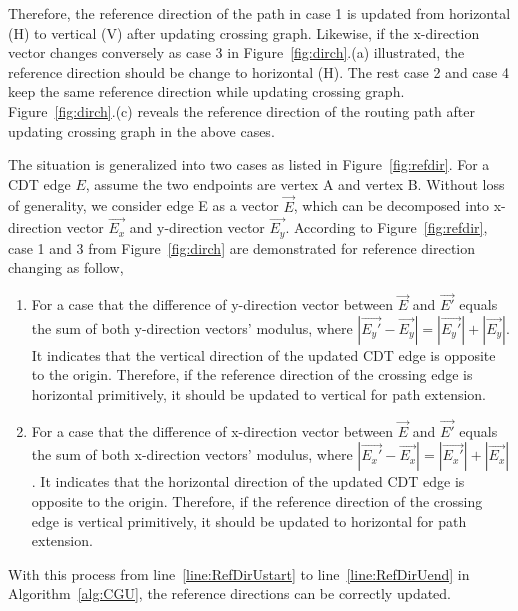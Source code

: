     Therefore, the reference direction of the path in case 1 is updated from horizontal (H) to vertical (V) after updating crossing graph. Likewise, if the x-direction vector changes conversely as case 3 in Figure~\ref{fig:dirch}.(a) illustrated, the reference direction should be change to horizontal (H). The rest case 2 and case 4 keep the same reference direction while updating crossing graph. Figure~\ref{fig:dirch}.(c) reveals the reference direction of the routing path after updating crossing graph in the above cases.

    The situation is generalized into two cases as listed in Figure~\ref{fig:refdir}.
    For a CDT edge $E$, assume the two endpoints are vertex A and vertex B. Without loss of generality, we consider edge E as a vector $\overrightarrow{E}$, which can be decomposed into x-direction vector $\overrightarrow{E_x}$ and y-direction vector $\overrightarrow{E_y}$. According to Figure~\ref{fig:refdir}, case 1 and 3 from Figure~\ref{fig:dirch} are demonstrated for reference direction changing as follow, 

    


    \begin{enumerate}
      \item For a case that the difference of y-direction vector between $\overrightarrow{E}$ and $\overrightarrow{E'}$ equals the sum of both y-direction vectors' modulus, where $|\overrightarrow{E_y'} - \overrightarrow{E_y}|=|\overrightarrow{E_y'}|+|\overrightarrow{E_y}|$. It indicates that the vertical direction of the updated CDT edge is opposite to the origin. Therefore, if the reference direction of the crossing edge is horizontal primitively, it should be updated to vertical for path extension.
      \item For a case that the difference of x-direction vector between $\overrightarrow{E}$ and $\overrightarrow{E'}$ equals the sum of both x-direction vectors' modulus, where $|\overrightarrow{E_x'} - \overrightarrow{E_x}|=|\overrightarrow{E_x'}|+|\overrightarrow{E_x}|$. It indicates that the horizontal direction of the updated CDT edge is opposite to the origin. Therefore, if the reference direction of the crossing edge is vertical primitively, it should be updated to horizontal for path extension.
    \end{enumerate}

    

    With this process from line~\ref{line:RefDirUstart} to line~\ref{line:RefDirUend} in Algorithm~\ref{alg:CGU}, the reference directions can be correctly updated.


